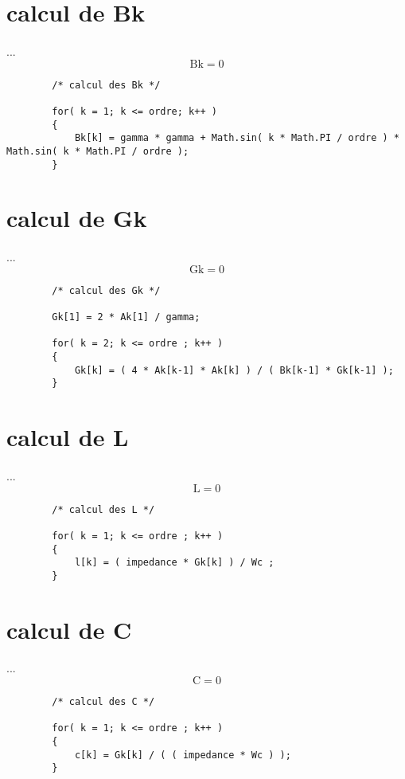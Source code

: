 \documentclass[a4paper,11pt]{article}
\begin{document}
\section{calcul de Bk }
    \paragraph{}
    ... \[ \mbox{Bk} = 0 \]
    \begin{lstlisting}
        /* calcul des Bk */

        for( k = 1; k <= ordre; k++ )
        {
            Bk[k] = gamma * gamma + Math.sin( k * Math.PI / ordre ) * Math.sin( k * Math.PI / ordre );
        }

    \end{lstlisting}

\section{calcul de Gk }
    \paragraph{}
    ... \[ \mbox{Gk} = 0 \]
    \begin{lstlisting}
        /* calcul des Gk */

        Gk[1] = 2 * Ak[1] / gamma;

        for( k = 2; k <= ordre ; k++ )
        {
            Gk[k] = ( 4 * Ak[k-1] * Ak[k] ) / ( Bk[k-1] * Gk[k-1] );
        }

    \end{lstlisting}

\section{calcul de L }
    \paragraph{}
    ... \[ \mbox{L} = 0 \]
    \begin{lstlisting}
        /* calcul des L */

        for( k = 1; k <= ordre ; k++ )
        {
            l[k] = ( impedance * Gk[k] ) / Wc ;
        }

    \end{lstlisting}

\section{calcul de C }
    \paragraph{}
    ... \[ \mbox{C} = 0 \]
    \begin{lstlisting}
        /* calcul des C */

        for( k = 1; k <= ordre ; k++ )
        {
            c[k] = Gk[k] / ( ( impedance * Wc ) );
        }

    \end{lstlisting}
\end{document}
